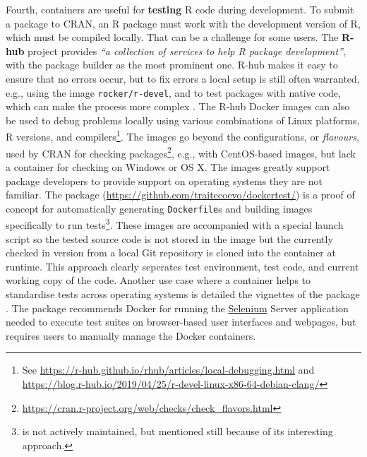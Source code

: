 Fourth, containers are useful for \textbf{testing} R code during
development. To submit a package to CRAN, an R package must work with
the development version of R, which must be compiled locally. That can
be a challenge for some users. The \textbf{R-hub} project provides
\emph{``a collection of services to help R package development''}, with
the package builder as the most prominent one\citep{r-hub_docs_2019}.
R-hub makes it easy to ensure that no errors occur, but to fix errors a
local setup is still often warranted, e.g., using the image
\texttt{rocker/r-devel}, and to test packages with native code, which
can make the process more complex \citep[cf.][]{eckert_building_2018}.
The R-hub Docker images can also be used to debug problems locally using
various combinations of Linux platforms, R versions, and
compilers\footnote{See \href{https://r-hub.github.io/rhub/articles/local-debugging.html}{https://r-hub.github.io/rhub/articles/local-debugging.html} and \href{https://blog.r-hub.io/2019/04/25/r-devel-linux-x86-64-debian-clang/}{https://blog.r-hub.io/2019/04/25/r-devel-linux-x86-64-debian-clang/}}.
The images go beyond the configurations, or \emph{flavours}, used by
CRAN for checking
packages\footnote{\href{https://cran.r-project.org/web/checks/check_flavors.html}{https://cran.r-project.org/web/checks/check\_flavors.html}},
e.g., with CentOS-based images, but lack a container for checking on
Windows or OS X. The images greatly support package developers to
provide support on operating systems they are not familiar. The package
 (\url{https://github.com/traitecoevo/dockertest/}) is a
proof of concept for automatically generating \texttt{Dockerfile}s and
building images specifically to run
tests\footnote{ is not actively maintained, but mentioned still because of its interesting approach.}.
These images are accompanied with a special launch script so the tested
source code is not stored in the image but the currently checked in
version from a local Git repository is cloned into the container at
runtime. This approach clearly seperates test environment, test code,
and current working copy of the code. \label{rselenium} Another use case
where a container helps to standardise tests across operating systems is
detailed the vignettes of the package 
\citep{rselenium_2019}. The package recommends Docker for running the
\href{https://selenium.dev/}{Selenium} Server application needed to
execute test suites on browser-based user interfaces and webpages, but
requires users to manually manage the Docker containers.

